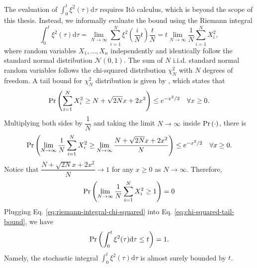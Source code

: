     The evaluation of $\displaystyle \int_{0}^{t} \xi^2(\tau)\mathrm{d}\tau$ requires It\^o calculus, which is beyond the scope of this thesis. 
    Instead, we informally evaluate the bound using the Riemann integral
    \begin{equation}\label{eq:riemann-integral-chi-squared}
        \int_0^t \xi^2(\tau) \mathrm{d}\tau = \lim_{N \to \infty} \sum_{i=1}^{N} \xi^2\left(\frac{i}{N}t\right) \frac{t}{N} = t \lim_{N \to \infty} \frac{1}{N}\sum_{i=1}^{N} X_i^2,
    \end{equation}
    where random variables $X_1, \dots, X_n$ independently and identically follow the standard normal distribution $\mathcal{N}(0, 1)$.
    The sum of $N$ i.i.d. standard normal random variables follows the chi-squared distribution $\chi^2_N$ with $N$ degrees of freedom.
    A tail bound for $\chi^2_N$ distribution is given by \citeauthor{laurent2000adaptive} \cite{laurent2000adaptive}, which states that
    \begin{equation}
        \P{\sum_{i=1}^{N}X_i^2 \geq N + \sqrt{2N}x + 2x^2} \leq e^{-x^2/2} \quad \forall x \geq 0. 
    \end{equation}
    Multiplying both sides by $\dfrac{1}{N}$ and taking the limit $N \to \infty$ inside $\P{\cdot}$, there is
    \begin{equation}
        \P{\lim_{N \to \infty} \frac{1}{N}\sum_{i=1}^{N}X_i^2 \geq \lim_{N\to\infty} \frac{N + \sqrt{2N}x + 2x^2}{N}} \leq e^{-x^2/2} \quad \forall x \geq 0. 
    \end{equation}
    Notice that $\dfrac{N + \sqrt{2N}x + 2x^2}{N} \to 1$ for any $x \geq 0$ as $N \to \infty$. Therefore, 
    \begin{equation} \label{eq:chi-squared-tail-bound}
        \P{\lim_{N \to \infty} \frac{1}{N}\sum_{i=1}^{N}X_i^2 \geq 1} = 0
    \end{equation}
    Plugging Eq. \eqref{eq:riemann-integral-chi-squared} into Eq. \eqref{eq:chi-squared-tail-bound}, we have
    \begin{equation}
        \P{\int_0^t \xi^2(\tau) \mathrm{d}\tau \leq t} = 1.
    \end{equation}
    Namely, the stochastic integral $\displaystyle \int_0^t \xi^2(\tau) \mathrm{d}\tau$ is almost surely bounded by $t$. 

